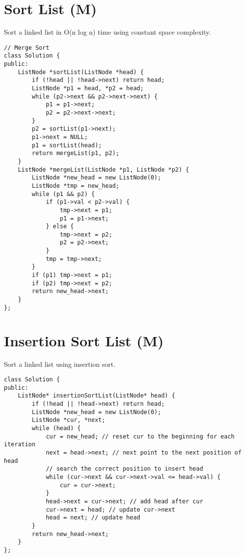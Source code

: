 \section{Sort List (M)}
Sort a linked list in O(n log n) time using constant space complexity.\\

\begin{lstlisting}
// Merge Sort
class Solution {
public:
    ListNode *sortList(ListNode *head) {
        if (!head || !head->next) return head;
        ListNode *p1 = head, *p2 = head;
        while (p2->next && p2->next->next) {
            p1 = p1->next;
            p2 = p2->next->next;
        }
        p2 = sortList(p1->next);
        p1->next = NULL;
        p1 = sortList(head);
        return mergeList(p1, p2);
    }
    ListNode *mergeList(ListNode *p1, ListNode *p2) {
        ListNode *new_head = new ListNode(0);
        ListNode *tmp = new_head;
        while (p1 && p2) {
            if (p1->val < p2->val) {
                tmp->next = p1;
                p1 = p1->next;
            } else {
                tmp->next = p2;
                p2 = p2->next;
            }
            tmp = tmp->next;
        }
        if (p1) tmp->next = p1;
        if (p2) tmp->next = p2;
        return new_head->next;
    }
};
\end{lstlisting}


\section{Insertion Sort List (M)}
Sort a linked list using insertion sort.\\

\begin{lstlisting}
class Solution {
public:
    ListNode* insertionSortList(ListNode* head) {
        if (!head || !head->next) return head;
        ListNode *new_head = new ListNode(0);
        ListNode *cur, *next;
        while (head) {
            cur = new_head; // reset cur to the beginning for each iteration
            next = head->next; // next point to the next position of head
            // search the correct position to insert head
            while (cur->next && cur->next->val <= head->val) {
                cur = cur->next;
            }
            head->next = cur->next; // add head after cur
            cur->next = head; // update cur->next
            head = next; // update head
        }
        return new_head->next;
    }
};
\end{lstlisting}






